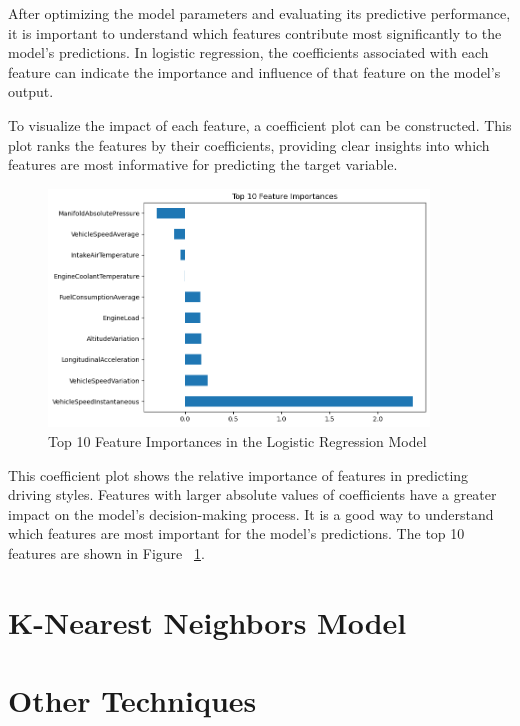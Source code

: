 After optimizing the model parameters and evaluating its predictive performance, it is important to understand which features contribute most significantly to the model's predictions. 
In logistic regression, the coefficients associated with each feature can indicate the importance and influence of that feature on the model's output. 

To visualize the impact of each feature, a coefficient plot can be constructed. This plot ranks the features by their coefficients, providing clear insights into which features are 
most informative for predicting the target variable.

\begin{figure}[H]
    \centering
    \includegraphics[width=0.9\textwidth]{images/feature_importance.png} 
    \caption{Top 10 Feature Importances in the Logistic Regression Model}
    \label{fig:feature_importances}
\end{figure}

This coefficient plot shows the relative importance of features in predicting driving styles. Features with larger absolute values of coefficients have a greater impact on the model's 
decision-making process. It is a good way to understand which features are most important for the model's predictions. The top 10 features are shown in Figure ~\ref{fig:feature_importances}.

\section{K-Nearest Neighbors Model}

    
\section{Other Techniques}


